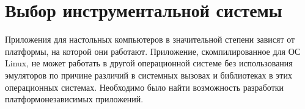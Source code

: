 \documentclass[a4paper,14pt]{extreport}
\begin{document}
	
	\chapter{Выбор инструментальной системы}
	
	Приложения для настольных компьютеров в значительной степени зависят от платформы, на которой они работают. Приложение, скомпилированное для ОС Linux, не может работать в другой операционной системе без использования эмуляторов по причине различий в системных вызовах и библиотеках в этих операционных системах. Необходимо было найти возможность разработки платформонезависимых приложений.
	 
\end{document}
